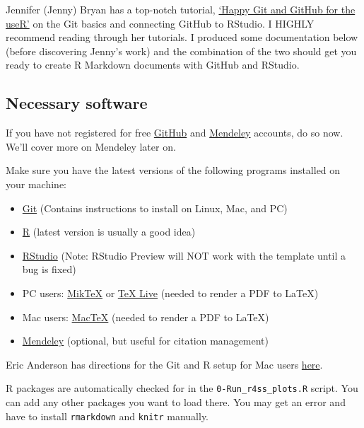 \documentclass[12pt,]{article}
\begin{document}
Jennifer (Jenny) Bryan has a top-notch tutorial,
\href{http://happygitwithr.com/}{`Happy Git and GitHub for the useR'} on
the Git basics and connecting GitHub to RStudio. I HIGHLY recommend
reading through her tutorials. I produced some documentation below
(before discovering Jenny's work) and the combination of the two should
get you ready to create R Markdown documents with GitHub and RStudio.

\subsection{Necessary software}\label{necessary-software}

If you have not registered for free \href{https://github.com}{GitHub}
and \href{www.mendeley.com}{Mendeley} accounts, do so now. We'll cover
more on Mendeley later on.

Make sure you have the latest versions of the following programs
installed on your machine:\\

\begin{itemize}[noitemsep,nolistsep,topsep=0pt]
\item \href{https://git-scm.com/book/en/v2/Getting-Started-Installing-Git}{Git} (Contains instructions to install on Linux, Mac, and PC)  
\item \href{https://cran.r-project.org/bin/windows/base/}{R} (latest version is usually a good idea)    
\item \href{https://www.rstudio.com/products/rstudio/download3/}{RStudio} (Note: RStudio Preview will NOT work with the template until a bug is fixed)    
\item PC users: \href{http://miktex.org/}{MikTeX} or \href{https://www.tug.org/texlive/}{TeX Live} (needed to render a PDF to LaTeX)   
\item Mac users: \href{http://www.tug.org/mactex/}{MacTeX} (needed to render a PDF to LaTeX)   
\item \href{https://www.mendeley.com/}{Mendeley} (optional, but useful for citation management)    
 \end{itemize}

Eric Anderson has directions for the Git and R setup for Mac users
\href{http://eriqande.github.io/rep-res-web/assign/assign-0.html\#assignment-0}{here}.

R packages are automatically checked for in the
\texttt{0-Run\_r4ss\_plots.R} script. You can add any other packages you
want to load there. You may get an error and have to install
\texttt{rmarkdown} and \texttt{knitr} manually.
\end{document}
